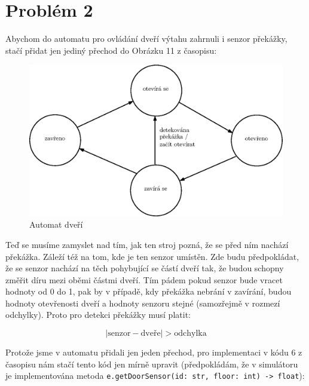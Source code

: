 \documentclass{fkssolpub}
\author{Ondřej Sedláček}
\begin{document}
 

\section{Problém 2}

Abychom do automatu pro ovládání dveří výtahu zahrnuli i senzor překážky,
stačí přidat jen jediný přechod do Obrázku 11 z časopisu:

\begin{figure}[h!]
  \centering
  \includegraphics{Automat dveří.eps}
  \caption{Automat dveří}
  \label{fig:automata}
\end{figure}

Teď se musíme zamyslet nad tím, jak ten stroj pozná, že se před ním nachází
překážka. Záleží též na tom, kde je ten senzor umístěn. Zde budu předpokládat,
že se senzor nachází na těch pohybující se částí dveří tak, že budou schopny
změřit díru mezi oběmi částmi dveří. Tím pádem pokud senzor bude vracet
hodnoty od 0 do 1, pak by v případě, kdy překážka nebrání v zavírání,
budou hodnoty otevřenosti dveří a hodnoty senzoru stejné (samozřejmě
v rozmezí odchylky). Proto pro detekci překážky musí platit:

\[
  |\text{senzor} - \text{dveře}| > \text{odchylka}
\]

Protože jsme v automatu přidali jen jeden přechod, pro implementaci v kódu
6 z časopisu nám stačí tento kód jen mírně upravit (předpokládám, že v simulátoru
je implementována metoda \lstinline{e.getDoorSensor(id: str, floor: int) -> float}):
\end{document}
